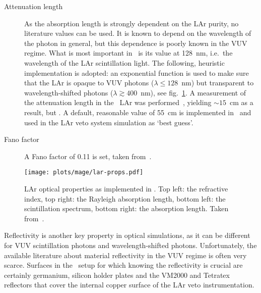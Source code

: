 \begin{description}
  \item[Attenuation length] As the absorption length is strongly dependent on the LAr
    purity, no literature values can be used. It is known to depend on the wavelength of
    the photon in general, but this dependence is poorly known in the VUV regime. What is
    most important in \mage\ is its value at 128~nm, i.e.~the wavelength of the LAr
    scintillation light. The following, heuristic implementation is adopted: an
    exponential function is used to make sure that the LAr is opaque to VUV photons
    ($\lambda \leq 128$~nm) but transparent to wavelength-shifted photons ($\lambda
    \gtrsim 400$~nm), see fig.~\ref{fig:bkg:lar:ph2:mage:lar-props}. A measurement of the
    attenuation length in the \gerda\ LAr was performed~\cite{Barros2020}, yielding
    $\sim15$~cm as a result, but . A default, reasonable value of 55~cm is
    implemented in \mage\ and used in the LAr veto system simulation as `best guess'.

  \item[Fano factor] A Fano factor of 0.11 is set, taken from~\cite{Doke1976}.

\end{description}

\begin{figure}
  \centering
  \texttt{[image: plots/mage/lar-props.pdf]}
  \caption{%
    LAr optical properties as implemented in \mage. Top left: the refractive index, top
    right: the Rayleigh absorption length, bottom left: the scintillation spectrum, bottom
    right: the absorption length. Taken from~\cite{Bideau-Mehu1981, Seidel2002,
    Heindl2010}.
  }\label{fig:bkg:lar:ph2:mage:lar-props}
\end{figure}

Reflectivity is another key property in optical simulations, as it can be different for
VUV scintillation photons and wavelength-shifted photons. Unfortunately, the available
literature about material reflectivity in the VUV regime is often very scarce. Surfaces
in the \gerda\ setup for which knowing the reflectivity is crucial are certainly
germanium, silicon holder plates and the VM2000 and Tetratex\reg{} reflectors that cover
the internal copper surface of the LAr veto instrumentation.

